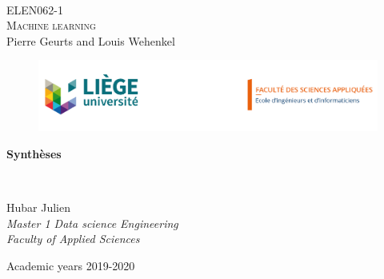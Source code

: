 \documentclass[a4paper, 12pt]{report}
\date{\today}
\begin{document}
\begin{titlepage}
	\begin{center}
	~~\\
		 
		
		{\fontsize{20}{20}\selectfont
		\textsc{ELEN062-1} \\
		
		\textsc{Machine learning }\\
		\vspace{0.3cm}
	    Pierre Geurts and Louis Wehenkel
		\vspace{2cm}
		
	\begin{figure}
	    \centering
	    \includegraphics[width=16cm]{entete.png} 
	\end{figure}
	
	
	
		

		\vspace{0.1cm}
		
		\hrulefill
		
		\vspace{0.2cm}
		{\fontsize{30}{25}\selectfont \textbf{Synthèses}\\}
		\vspace{0.2cm}
		
		

		\hrulefill

		\vspace{1cm}
~~\\
		{\fontsize{20}{25}\selectfont
		Hubar Julien \\
		\vspace{3.1cm}
		\textit{Master 1 Data science Engineering}\\
		\textit{Faculty of Applied Sciences}
	   	
	  \vspace{2cm}
	  
		Academic years 2019-2020}
		}
	\end{center}

\end{titlepage}
\end{document}
